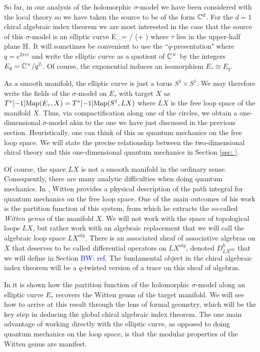 \documentclass[10pt]{amsart}
\def\brian{\textcolor{blue}{BW: }\textcolor{blue}}
\begin{document}
So far, in our analysis of the holomorphic $\sigma$-model we have been considered with the local theory so we have taken the source to be of the form $\mathbb C^d$. 
For the $d=1$ chiral algebraic index theorem we are most interested in the case that the source of this $\sigma$-model is an elliptic curve 
\ben
E_\tau = \CC / (\ZZ + \tau \ZZ)
\een
where $\tau$ lies in the upper-half plane $\mathbb H$. 
It will sometimes be convenient to use the ``$q$-presentation" where $q = e^{2 \pi i \tau}$ and write the elliptic curve as a quotient of $\mathbb C^\times$ by the integers $E_q = \mathbb C^\times / q^\mathbb Z$.
Of course, the exponential induces an isomorphism $E_\tau \cong E_q$. 

As a smooth manifold, the elliptic curve is just a torus $S^1 \times S^1$. 
We may therefore write the fields of the $\sigma$-model on $E_\tau$ with target $X$ as $T^*[-1]{\rm Map}(E_\tau, X) = T^*[-1] {\rm Map}(S^1, L X)$ where $LX$ is the free loop space of the manifold $X$.
Thus, via compactification along one of the circles, we obtain a one-dimensional $\sigma$-model akin to the one we have just discussed in the previous section. 
Heuristically, one can think of this as quantum mechanics on the free loop space. 
We will state the precise relationship between the two-dimensional chiral theory and this one-dimensional quantum mechanics in Section \ref{sec: }.

Of course, the space $LX$ is not a smooth manifold in the ordinary sense.
Consequently, there are many analytic difficulties when doing quantum mechanics. 
In \cite{WittenDirac}, Witten provides a physical description of the path integral for quantum mechanics on the free loop space.
One of the main outcomes of his work is the partition function of this system, from which he extracts the so-called {\em Witten genus} of the manifold $X$.
We will not work with the space of topological loops $LX$, but rather work with an algebraic replacement that we will call the algebraic loop space $LX^{alg}$.
There is an associated sheaf of associative algebras on $X$ that deserves to be called differential operators on $LX^{alg}$, denoted $D^{\hbar}_{LX^{alg}}$ that we will define in Section \brian{ref}. 
The fundamental object in the chiral algebraic index theorem will be a $q$-twisted version of a trace on this sheaf of algebras. 

In \cite{CostelloWG1,CostelloWG2} it is shown how the partition function of the holomorphic $\sigma$-model along an elliptic curve $E_\tau$ recovers the Witten genus of the target manifold. 
We will see how to arrive at this result through the lens of formal geometry, which will be the key step in deducing the global chiral algebraic index theorem. 
The one main advantage of working directly with the elliptic curve, as opposed to doing quantum mechanics on the loop space, is that the modular properties of the Witten genus are manifest. 
\end{document}
